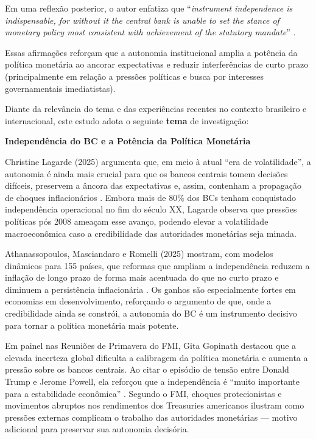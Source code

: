 \documentclass[a4paper,12pt]{article}
\begin{document}
Em uma reflexão posterior, o autor enfatiza que “\emph{instrument independence is indispensable, for without it the central bank is unable to set the stance of monetary policy most consistent with achievement of the statutory mandate}” \cite{fischer2015}.

Essas afirmações reforçam que a autonomia institucional amplia a potência da política monetária ao ancorar expectativas e reduzir interferências de curto prazo (principalmente em relação a pressões políticas e busca por interesses governamentais imediatistas).

Diante da relevância do tema e das experiências recentes no contexto brasileiro e internacional, este estudo adota o seguinte \textbf{tema} de investigação:

\begin{center}
\vspace{0.5em}
\textbf{\Large Independência do BC e a Potência da Política Monetária}
\vspace{0.5em}
\end{center}

Christine Lagarde (2025) argumenta que, em meio à atual “era de volatilidade”, a autonomia é ainda mais crucial para que os bancos centrais tomem decisões difíceis, preservem a âncora das expectativas e, assim, contenham a propagação de choques inflacionários \cite{lagarde2025}. Embora mais de 80\% dos BCs tenham conquistado independência operacional no fim do século XX, Lagarde observa que pressões políticas pós 2008 ameaçam esse avanço, podendo elevar a volatilidade macroeconômica caso a credibilidade das autoridades monetárias seja minada.

Athanassopoulos, Masciandaro e Romelli (2025) mostram, com modelos dinâmicos para 155 países, que reformas que ampliam a independência reduzem a inflação de longo prazo de forma mais acentuada do que no curto prazo e diminuem a persistência inflacionária \cite{athanassopoulos2025}. Os ganhos são especialmente fortes em economias em desenvolvimento, reforçando o argumento de que, onde a credibilidade ainda se constrói, a autonomia do BC é um instrumento decisivo para tornar a política monetária mais potente.

Em painel nas Reuniões de Primavera do FMI, Gita Gopinath destacou que a elevada incerteza global dificulta a calibragem da política monetária e aumenta a pressão sobre os bancos centrais. Ao citar o episódio de tensão entre Donald Trump e Jerome Powell, ela reforçou que a independência é “muito importante para a estabilidade econômica” \cite{cnnbrasil2025}. Segundo o FMI, choques protecionistas e movimentos abruptos nos rendimentos dos Treasuries americanos ilustram como pressões externas complicam o trabalho das autoridades monetárias — motivo adicional para preservar sua autonomia decisória.
\end{document}
